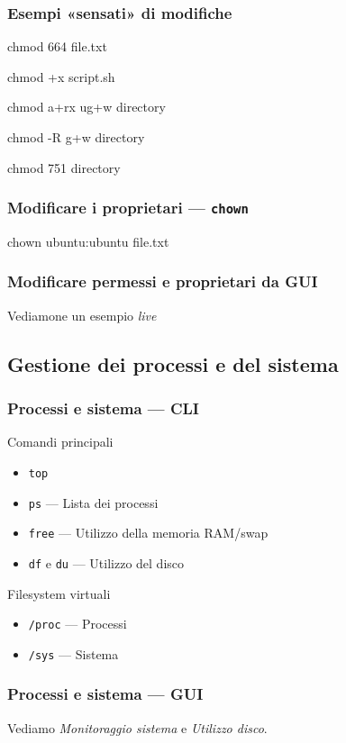 \documentclass{beamer}
\newenvironment{shell*}{\par\vspace{.5em}\begin{beamercolorbox}[rounded=true,sep=.2em]{shell snippet}\ttfamily {\color{red}\#}}{\end{beamercolorbox}}
\begin{document}
\begin{frame}[t]
  \frametitle{Esempi «sensati» di modifiche}
  \begin{shell*}
    chmod 664 file.txt
  \end{shell*}

  \begin{shell*}
    chmod +x script.sh
  \end{shell*}

  \begin{shell*}
    chmod a+rx ug+w directory
  \end{shell*}

  \begin{shell*}
    chmod -R g+w directory
  \end{shell*}

  \begin{shell*}
    chmod 751 directory
  \end{shell*}

\end{frame}

\begin{frame}
  \frametitle{Modificare i proprietari --- \texttt{chown}}

  \begin{shell*}
    chown \alert<2>{ubuntu}:\alert<3>{ubuntu} file.txt
  \end{shell*}
  
\end{frame}

\begin{frame}
  \frametitle{Modificare permessi e proprietari da GUI}
  
  Vediamone un esempio \textit{live}
\end{frame}

\subsection{Gestione dei processi e del sistema}

\begin{frame}
  \frametitle{Processi e sistema --- CLI}
  
  \begin{block}{Comandi principali}
    \begin{itemize}
      \item \texttt{top}
      \item \texttt{ps} --- Lista dei processi
      \item \texttt{free} --- Utilizzo della memoria RAM/swap
      \item \texttt{df} e \texttt{du} --- Utilizzo del disco
    \end{itemize}
  \end{block}

  \begin{block}{Filesystem virtuali}
    \begin{itemize}
      \item \texttt{/proc} --- Processi
      \item \texttt{/sys} --- Sistema
    \end{itemize}
  \end{block}
\end{frame}

\begin{frame}
  \frametitle{Processi e sistema --- GUI}
  Vediamo \textit{Monitoraggio sistema} e \textit{Utilizzo disco}.
\end{frame}
\end{document}
